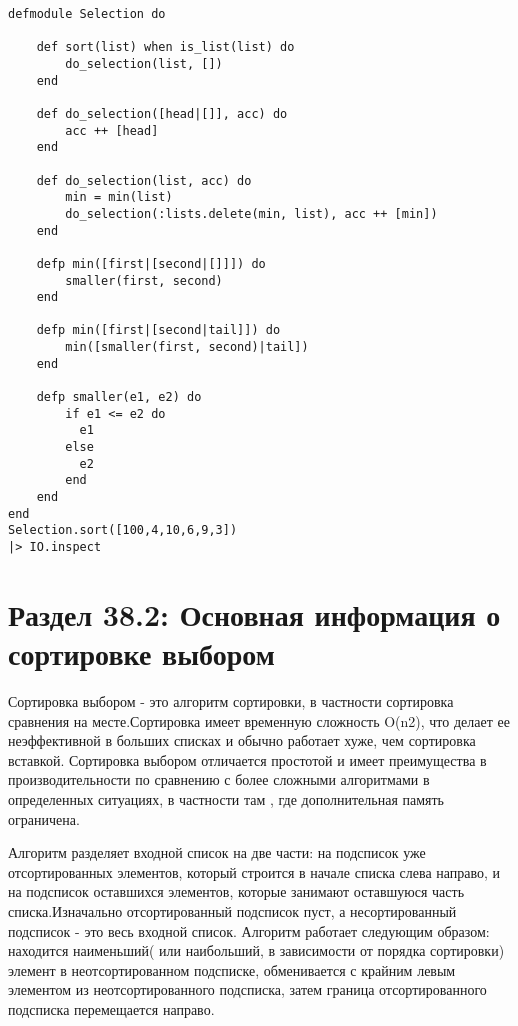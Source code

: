 \vspace{\baselineskip}
\begin{tcolorbox}
\begin{verbatim} 
defmodule Selection do

	def sort(list) when is_list(list) do
		do_selection(list, [])
	end
	
	def do_selection([head|[]], acc) do
		acc ++ [head]
	end
	
	def do_selection(list, acc) do
		min = min(list)
		do_selection(:lists.delete(min, list), acc ++ [min])
	end
	
	defp min([first|[second|[]]]) do
		smaller(first, second)
	end
	
	defp min([first|[second|tail]]) do
		min([smaller(first, second)|tail])
	end
	
	defp smaller(e1, e2) do
		if e1 <= e2 do
		  e1
		else
		  e2
		end
	end
end
Selection.sort([100,4,10,6,9,3])
|> IO.inspect

\end{verbatim}
\end{tcolorbox}

\section*{Раздел 38.2: Основная информация о сортировке выбором}

\vspace{\baselineskip}
Сортировка выбором - это алгоритм сортировки, в частности сортировка сравнения на месте.Сортировка имеет временную сложность O(n2), что делает ее неэффективной в больших списках и обычно работает хуже, чем сортировка вставкой. Сортировка выбором отличается простотой и имеет преимущества в производительности по сравнению с более сложными алгоритмами в определенных ситуациях, в частности там , где дополнительная память ограничена.

\vspace{\baselineskip}
Алгоритм разделяет входной список на две части: на подсписок уже отсортированных элементов, который строится в начале списка слева направо, и на подсписок оставшихся элементов, которые занимают оставшуюся часть списка.Изначально отсортированный подсписок пуст, а несортированный подсписок - это весь входной список. Алгоритм работает следующим образом: находится наименьший( или наибольший, в зависимости от порядка сортировки) элемент в неотсортированном подсписке, обменивается с крайним левым элементом из неотсортированного подсписка, затем граница отсортированного подсписка перемещается направо.

